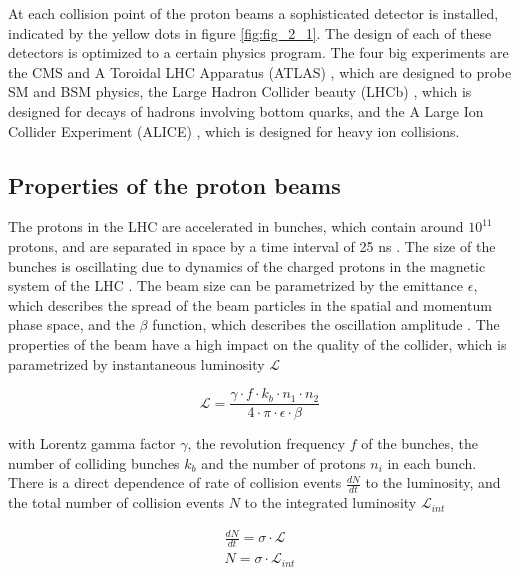 At each collision point of the proton beams a sophisticated detector is installed, indicated by the yellow dots in figure \ref{fig:fig_2_1}. The design of each of these detectors is optimized to a certain physics program. The four big experiments are the \gls{CMS} and A Toroidal LHC Apparatus (\gls{ATLAS}) \cite{ATLAS}, which are designed to probe \gls{SM} and \gls{BSM} physics, the Large Hadron Collider beauty (\gls{LHCb}) \cite{LHCb}, which is designed for decays of hadrons involving bottom quarks, and the A Large Ion Collider Experiment (\gls{ALICE}) \cite{ALICE}, which is designed for heavy ion collisions.


\subsection{Properties of the proton beams}
\label{sec:section_2_1_1}

The protons in the \gls{LHC} are accelerated in bunches, which contain around $10^{11}$ protons, and are separated in space by a time interval of 25 ns \cite{LHCSTATS}. The size of the bunches is oscillating due to dynamics of the charged protons in the magnetic system of the \gls{LHC} \cite{LHC}. The beam size can be parametrized by the emittance $\epsilon$, which describes the spread of the beam particles in the spatial and momentum phase space, and the $\beta$ function, which describes the oscillation amplitude \cite{BEAMPHY}. The properties of the beam have a high impact on the quality of the collider, which is parametrized by instantaneous luminosity $\mathcal{L}$ \cite{Luminosity}

\begin{equation}
	\label{eq:eq_2_1}
	\mathcal{L} = \frac{\gamma \cdot f \cdot k_{b} \cdot n_{1} \cdot n_{2}}{4 \cdot \pi \cdot \epsilon \cdot \beta}
\end{equation} 

with Lorentz gamma factor $\gamma$, the revolution frequency $f$ of the bunches, the number of colliding bunches $k_{b}$ and the number of protons $n_{i}$ in each bunch. There is a direct dependence of rate of collision events $\frac{dN}{dt}$ to the luminosity, and the total number of collision events $N$ to the integrated luminosity $\mathcal{L}_{int}$

\begin{equation}
	\label{eq:eq_2_2}
	\begin{split}
		\frac{dN}{dt} = \sigma \cdot \mathcal{L} \\
		N = \sigma \cdot \mathcal{L}_{int}
	\end{split}
\end{equation}	

